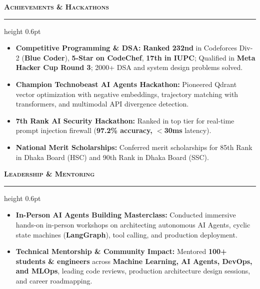 \documentclass[9.5pt,a4paper]{article}
\newcommand{\resumesection}[1]{%
    \vspace{4.0pt}%
    {\color{burgundy}\scshape\bfseries\fontsize{10.0pt}{11.2pt}\selectfont #1}%
    \vspace{1.0pt}%
    \hrule height 0.6pt\relax%
    \vspace{2.5pt}%
}
\begin{document}
\resumesection{Achievements \& Hackathons}
\begin{itemize}
    \item \textbf{Competitive Programming \& DSA:} \textbf{Ranked 232nd} in Codeforces Div-2 (\textbf{Blue Coder}), \textbf{5-Star on CodeChef}, \textbf{17th in IUPC}; Qualified in \textbf{Meta Hacker Cup Round 3}; 2000+ DSA and system design problems solved.
    \item \textbf{Champion \;\textbar\; Technobeast AI Agents Hackathon:} Pioneered Qdrant vector optimization with negative embeddings, trajectory matching with transformers, and multimodal API divergence detection.
    \item \textbf{7th Rank \;\textbar\; AI Security Hackathon:} Ranked in top tier for real-time prompt injection firewall (\textbf{97.2\% accuracy, $<$30ms} latency).
    \item \textbf{National Merit Scholarships:} Conferred merit scholarships for 85th Rank in Dhaka Board (HSC) and 90th Rank in Dhaka Board (SSC).
\end{itemize}

\resumesection{Leadership \& Mentoring}
\begin{itemize}
    \item \textbf{In-Person AI Agents Building Masterclass:} Conducted immersive hands-on in-person workshops on architecting autonomous AI Agents, cyclic state machines (\textbf{LangGraph}), tool calling, and production deployment.
    \item \textbf{Technical Mentorship \& Community Impact:} Mentored \textbf{100+ students \& engineers} across \textbf{Machine Learning, AI Agents, DevOps, and MLOps}, leading code reviews, production architecture design sessions, and career roadmapping.
\end{itemize}
\end{document}
